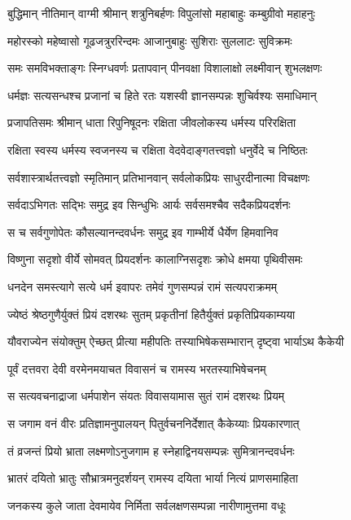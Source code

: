 \twolineshloka
{बुद्धिमान् नीतिमान् वाग्मी श्रीमान् शत्रुनिबर्हणः}
{विपुलांसो महाबाहुः कम्बुग्रीवो महाहनुः}%

\twolineshloka
{महोरस्को महेष्वासो गूढजत्रुररिन्दमः}
{आजानुबाहुः सुशिराः सुललाटः सुविक्रमः}%

\twolineshloka
{समः समविभक्ताङ्गः स्निग्धवर्णः प्रतापवान्}
{पीनवक्षा विशालाक्षो लक्ष्मीवान् शुभलक्षणः}%

\twolineshloka
{धर्मज्ञः सत्यसन्धश्च प्रजानां च हिते रतः}
{यशस्वी ज्ञानसम्पन्नः शुचिर्वश्यः समाधिमान्}%

\twolineshloka
{प्रजापतिसमः श्रीमान् धाता रिपुनिषूदनः}
{रक्षिता जीवलोकस्य धर्मस्य परिरक्षिता}%

\twolineshloka
{रक्षिता स्वस्य धर्मस्य स्वजनस्य च रक्षिता}
{वेदवेदाङ्गतत्त्वज्ञो धनुर्वेदे च निष्ठितः}%

\twolineshloka
{सर्वशास्त्रार्थतत्त्वज्ञो स्मृतिमान् प्रतिभानवान्}
{सर्वलोकप्रियः साधुरदीनात्मा विचक्षणः}%

\twolineshloka
{सर्वदाऽभिगतः सद्भिः समुद्र इव सिन्धुभिः}
{आर्यः सर्वसमश्चैव सदैकप्रियदर्शनः}%

\twolineshloka
{स च सर्वगुणोपेतः कौसल्यानन्दवर्धनः}
{समुद्र इव गाम्भीर्ये धैर्येण हिमवानिव}%

\twolineshloka
{विष्णुना सदृशो वीर्ये सोमवत् प्रियदर्शनः}
{कालाग्निसदृशः क्रोधे क्षमया पृथिवीसमः}%

\twolineshloka
{धनदेन समस्त्यागे सत्ये धर्म इवापरः}
{तमेवं गुणसम्पन्नं रामं सत्यपराक्रमम्}%

\twolineshloka
{ज्येष्ठं श्रेष्ठगुणैर्युक्तं प्रियं दशरथः सुतम्}
{प्रकृतीनां हितैर्युक्तं प्रकृतिप्रियकाम्यया}%

\twolineshloka
{यौवराज्येन संयोक्तुम् ऐच्छत् प्रीत्या महीपतिः}
{तस्याभिषेकसम्भारान् दृष्ट्वा भार्याऽथ कैकेयी}%

\twolineshloka
{पूर्वं दत्तवरा देवी वरमेनमयाचत}
{विवासनं च रामस्य भरतस्याभिषेचनम्}%

\twolineshloka
{स सत्यवचनाद्राजा धर्मपाशेन संयतः}
{विवासयामास सुतं रामं दशरथः प्रियम्}%

\twolineshloka
{स जगाम वनं वीरः प्रतिज्ञामनुपालयन्}
{पितुर्वचननिर्देशात् कैकेय्याः प्रियकारणात्}%

\twolineshloka
{तं व्रजन्तं प्रियो भ्राता लक्ष्मणोऽनुजगाम ह}
{स्नेहाद्विनयसम्पन्नः सुमित्रानन्दवर्धनः}%

\twolineshloka
{भ्रातरं दयितो भ्रातुः सौभ्रात्रमनुदर्शयन्}
{रामस्य दयिता भार्या नित्यं प्राणसमाहिता}%

\twolineshloka
{जनकस्य कुले जाता देवमायेव निर्मिता}
{सर्वलक्षणसम्पन्ना नारीणामुत्तमा वधूः}%

